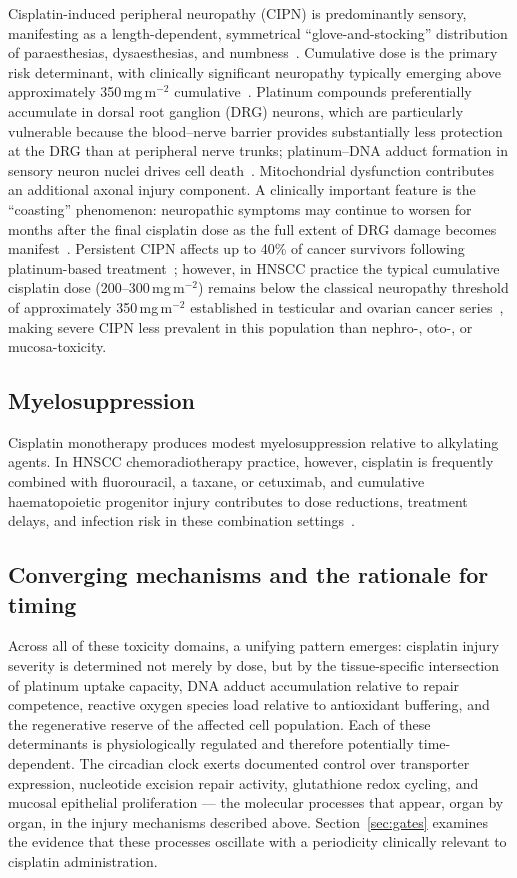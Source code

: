 \documentclass[preprint,review,12pt]{elsarticle}
\begin{document}
Cisplatin-induced peripheral neuropathy (CIPN) is predominantly sensory,
manifesting as a length-dependent, symmetrical ``glove-and-stocking''
distribution of paraesthesias, dysaesthesias, and numbness~\cite{Park2013}.
Cumulative dose is the primary risk determinant, with clinically significant
neuropathy typically emerging above approximately 350\,mg\,m$^{-2}$
cumulative~\cite{Park2013}. Platinum compounds preferentially accumulate in
dorsal root ganglion (DRG) neurons, which are particularly vulnerable because
the blood--nerve barrier provides substantially less protection at the DRG
than at peripheral nerve trunks; platinum--DNA adduct formation in sensory
neuron nuclei drives cell death~\cite{Park2013}. Mitochondrial dysfunction
contributes an additional axonal injury component. A clinically important
feature is the ``coasting'' phenomenon: neuropathic symptoms may continue
to worsen for months after the final cisplatin dose as the full extent of DRG
damage becomes manifest~\cite{Park2013}. Persistent CIPN affects up to 40\% of cancer survivors following
platinum-based treatment~\cite{Park2013}; however, in HNSCC practice the
typical cumulative cisplatin dose (200--300\,mg\,m$^{-2}$) remains below
the classical neuropathy threshold of approximately 350\,mg\,m$^{-2}$
established in testicular and ovarian cancer series~\cite{Strojan2016},
making severe CIPN less prevalent in this population than
nephro-, oto-, or mucosa-toxicity.

\subsection{Myelosuppression}

Cisplatin monotherapy produces modest myelosuppression relative to alkylating
agents. In HNSCC chemoradiotherapy practice, however, cisplatin is frequently
combined with fluorouracil, a taxane, or cetuximab, and cumulative
haematopoietic progenitor injury contributes to dose reductions, treatment
delays, and infection risk in these combination
settings~\cite{Szturz2017}.

\subsection{Converging mechanisms and the rationale for timing}

Across all of these toxicity domains, a unifying pattern emerges: cisplatin
injury severity is determined not merely by dose, but by the tissue-specific
intersection of platinum uptake capacity, DNA adduct accumulation relative to
repair competence, reactive oxygen species load relative to antioxidant
buffering, and the regenerative reserve of the affected cell population. Each
of these determinants is physiologically regulated and therefore potentially
time-dependent. The circadian clock exerts documented control over transporter
expression, nucleotide excision repair activity, glutathione redox cycling, and
mucosal epithelial proliferation --- the molecular processes that appear, organ
by organ, in the injury mechanisms described above. Section~\ref{sec:gates}
examines the evidence that these processes oscillate with a periodicity
clinically relevant to cisplatin administration.
\end{document}
